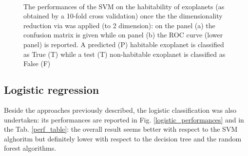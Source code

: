 \documentclass[
12pt, %
a4paper, %
oneside, %
headinclude,footinclude, %
BCOR5mm, %
]{scrartcl}
\begin{document}
\begin{figure}[h]
  \centering
{}\\
\caption{The performances of the SVM on the habitability of exoplanets (as obtained by a 10-fold cross validation) once the the dimensionality reduction via was applied (to 2 dimension): on the panel (a) the confusion matrix is given  while on panel (b) the ROC curve (lower panel) is reported. A predicted (P) habitable exoplanet is classified as True (T) while a test (T) non-habitable exoplanet is classified as False (F)}
\label{SVM+PCA_results}
\end{figure}

\clearpage


\subsection{Logistic regression}
Beside the approaches previously described, the logistic classification was also undertaken: its performances are reported in Fig. \ref{logistic_performances} and in the Tab. \ref{perf_table}: the overall result seems better with respect to the SVM alghoritm but definitely lower with respect to the decision tree and the random forest algorithms. 
\end{document}
